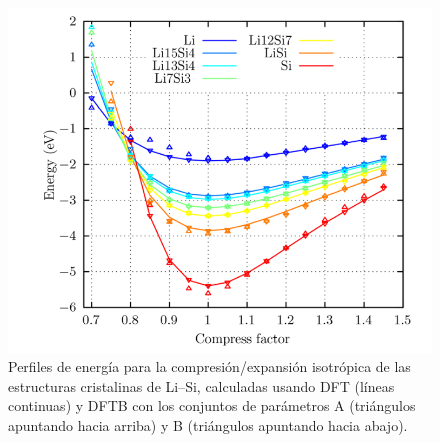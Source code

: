 \begin{figure}[th]
    \centering
    \includegraphics[width=.7\textwidth]{Silicio/modelo/resultados/compresion/compresion.png}
    \caption{Perfiles de energía para la compresión/expansión isotrópica de las 
    estructuras cristalinas de Li--Si, calculadas usando DFT (líneas continuas) 
    y DFTB con los conjuntos de parámetros A (triángulos apuntando hacia arriba)
    y B (triángulos apuntando hacia abajo).}
    \label{fig:compresion}
\end{figure}

